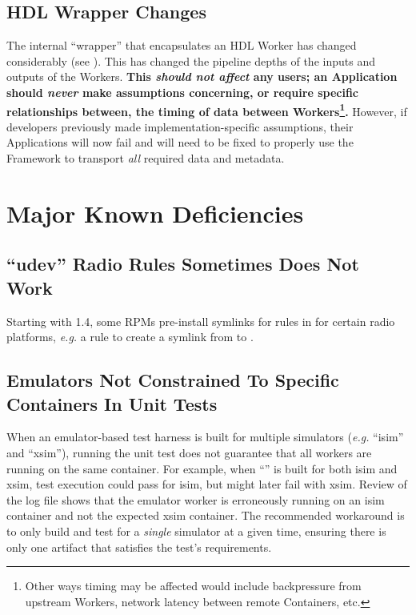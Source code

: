 \subsection{HDL Wrapper Changes} %
\label{sec:15_hdl_wrappers}
The internal ``wrapper'' that encapsulates an HDL Worker has changed considerably (see ).
This has changed the pipeline depths of the inputs and outputs of the Workers.
\textbf{This \textit{should not affect} any users; an Application should \textit{never} make assumptions concerning, or require specific relationships between, the timing of data between Workers\footnote{Other ways timing may be affected would include backpressure from upstream Workers, network latency between remote Containers,  etc.}.}
However, if developers previously made implementation-specific assumptions, their Applications will now fail and will need to be fixed to properly use the Framework to transport \textit{all} required data and metadata.

\section{Major Known Deficiencies}
\label{sec:15_bugs}

\subsection{``udev'' Radio Rules Sometimes Does Not Work} %
\label{bug:5275}
Starting with 1.4, some RPMs pre-install symlinks for rules in  for certain radio platforms, \textit{e.g.} a rule to create a symlink from  to .


\subsection{Emulators Not Constrained To Specific Containers In Unit Tests} %
\label{bug:5496}
When an emulator-based test harness is built for multiple simulators (\textit{e.g.} ``isim'' and ``xsim''), running the unit test does not guarantee that all workers are running on the same container.
For example, when ``'' is built for both isim and xsim, test execution could pass for isim, but might later fail with xsim.
Review of the log file shows that the emulator worker is erroneously running on an isim container and not the expected xsim container.
The recommended workaround is to only build and test for a \textit{single} simulator at a given time, ensuring there is only one artifact that satisfies the test's requirements.

